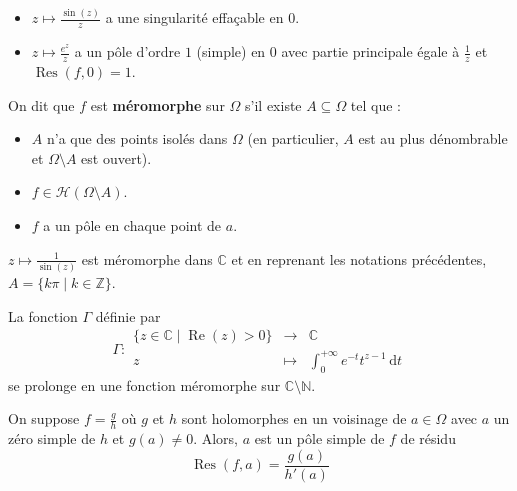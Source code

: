   \begin{example}
    \begin{itemize}
      \item $z \mapsto \frac{\sin(z)}{z}$ a une singularité effaçable en $0$.
      \item $z \mapsto \frac{e^z}{z}$ a un pôle d'ordre $1$ (simple) en $0$ avec partie principale égale à $\frac{1}{z}$ et $\operatorname{Res}(f, 0) = 1$.
    \end{itemize}
  \end{example}

  \begin{definition}
    On dit que $f$ est \textbf{méromorphe} sur $\Omega$ s'il existe $A \subseteq \Omega$ tel que :
    \begin{itemize}
      \item $A$ n'a que des points isolés dans $\Omega$ (en particulier, $A$ est au plus dénombrable et $\Omega \setminus A$ est ouvert).
      \item $f \in \mathcal{H}(\Omega \setminus A)$.
      \item $f$ a un pôle en chaque point de $a$.
    \end{itemize}
  \end{definition}

  \begin{example}
    $z \mapsto \frac{1}{\sin(z)}$ est méromorphe dans $\mathbb{C}$ et en reprenant les notations précédentes, $A = \{ k\pi \mid k \in \mathbb{Z} \}$.
  \end{example}


  \begin{example}
    La fonction $\Gamma$ définie par
    \[
      \Gamma :
      \begin{array}{ccc}
        \{ z \in \mathbb{C} \mid \operatorname{Re}(z) > 0 \} &\rightarrow& \mathbb{C} \\
        z &\mapsto& \int_{0}^{+\infty} e^{-t} t^{z-1} \, \mathrm{d}t
      \end{array}
    \]
    se prolonge en une fonction méromorphe sur $\mathbb{C} \setminus \mathbb{N}$.
  \end{example}


  \begin{proposition}
    On suppose $f = \frac{g}{h}$ où $g$ et $h$ sont holomorphes en un voisinage de $a \in \Omega$ avec $a$ un zéro simple de $h$ et $g(a) \neq 0$. Alors, $a$ est un pôle simple de $f$ de résidu
    \[ \operatorname{Res}(f, a) = \frac{g(a)}{h'(a)} \]
  \end{proposition}

